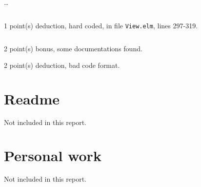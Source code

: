 \documentclass{article}
\begin{document}
\dots

\inputminted[firstline=250,lastline=259]{elm}{View.elm}

1 point(s) {\color{red}deduction}, hard coded, in file {\color{blue}\texttt{View.elm}}, lines {\color{blue}297-319}.

\inputminted[firstline=297,lastline=319]{elm}{View.elm}

2 point(s) {\color{red}bonus}, some documentations found.\medskip

2 point(s) {\color{red}deduction}, bad code format.\medskip



\newpage

\section{Readme}

Not included in this report.

\section{Personal work}

Not included in this report.


\newpage
\end{document}
